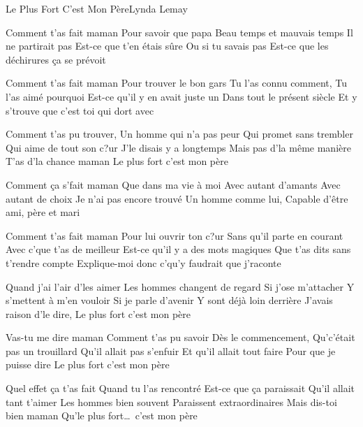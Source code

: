 \begin{Song}{Le Plus Fort C'est Mon Père}{Lynda Lemay}
\begin{multicols}{2}

\begin{Verse}
Comment t'as fait maman
Pour savoir que papa
Beau temps et mauvais temps
Il ne partirait pas
Est-ce que t'en étais sûre
Ou si tu savais pas
Est-ce que les déchirures ça se prévoit
\espaceInterStrophe

Comment t'as fait maman
Pour trouver le bon gars
Tu l'as connu comment,
Tu l'as aimé pourquoi
Est-ce qu'il y en avait juste un
Dans tout le présent siècle
Et y s'trouve que c'est toi qui dort avec
\end{Verse}
\espaceInterStrophe

\begin{Chorus}
Comment t'as pu trouver,
Un homme qui n'a pas peur
Qui promet sans trembler
Qui aime de tout son c?ur
J'le disais y a longtemps
Mais pas d'la même manière
T'as d'la chance maman
Le plus fort c'est mon père
\end{Chorus}
\espaceInterStrophe

\begin{Verse}
Comment ça s'fait maman
Que dans ma vie à moi
Avec autant d'amants
Avec autant de choix
Je n'ai pas encore trouvé
Un homme comme lui,
Capable d'être ami, père et mari
\columnbreak

Comment t'as fait maman
Pour lui ouvrir ton c?ur
Sans qu'il parte en courant
Avec c'que t'as de meilleur
Est-ce qu'il y a des mots magiques
Que t'as dits sans t'rendre compte
Explique-moi donc c'qu'y faudrait que j'raconte
\end{Verse}
\espaceInterStrophe

\begin{Chorus}
Quand j'ai l'air d'les aimer
Les hommes changent de regard
Si j'ose m'attacher
Y s'mettent à m'en vouloir
Si je parle d'avenir
Y sont déjà loin derrière
J'avais raison d'le dire,
Le plus fort c'est mon père
\espaceInterStrophe

Vas-tu me dire maman
Comment t'as pu savoir
Dès le commencement,
Qu'c'était pas un trouillard
Qu'il allait pas s'enfuir
Et qu'il allait tout faire
Pour que je puisse dire
Le plus fort c'est mon père
\end{Chorus}
\espaceInterStrophe

\begin{Verse}
Quel effet ça t'as fait
Quand tu l'as rencontré
Est-ce que ça paraissait
Qu'il allait tant t'aimer
Les hommes bien souvent
Paraissent extraordinaires
Mais dis-toi bien maman
Qu'le plus fort\dots\ c'est mon père
\end{Verse}


\end{multicols}
\end{Song}
